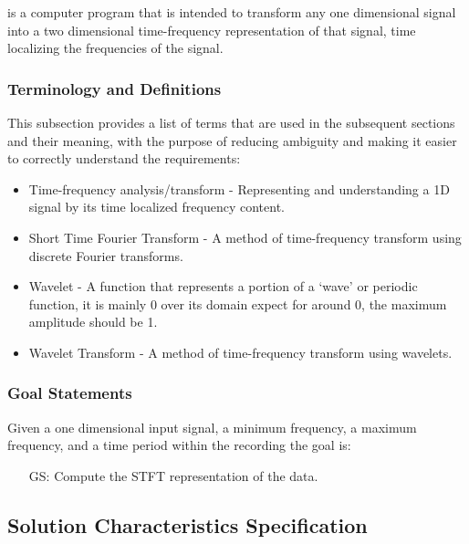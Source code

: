 \documentclass[12pt]{article}
\newcounter{goalnum} %
\begin{document}
\progname{} is a computer program that is intended to transform any one dimensional signal into a two dimensional time-frequency representation of that signal, time localizing the frequencies of the signal. 

\subsubsection{Terminology and  Definitions}

This subsection provides a list of terms that are used in the subsequent
sections and their meaning, with the purpose of reducing ambiguity and making it
easier to correctly understand the requirements:

\begin{itemize}
\item Time-frequency analysis/transform - Representing and understanding a 1D signal by its time localized frequency content.
\item Short Time Fourier Transform - A method of time-frequency transform using discrete Fourier transforms.
\item Wavelet - A function that represents a portion of a `wave' or periodic function, it is mainly 0 over its domain expect for around 0, the maximum amplitude should be 1.
\item Wavelet Transform - A method of time-frequency transform using wavelets.

\end{itemize}

\subsubsection{Goal Statements} \label{goal_state}

\noindent Given a one dimensional input signal, a minimum frequency, a maximum frequency, and a time period within the recording the goal is:

\begin{itemize}

\item[GS\refstepcounter{goalnum}\thegoalnum \label{G_meaningfulLabel}:] Compute the STFT representation of the data.

\end{itemize}

\subsection{Solution Characteristics Specification}
\end{document}
